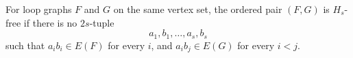 \begin{definition}
For loop graphs \(F\) and \(G\) on the same vertex set, the ordered pair \((F,G)\) is \(H_s\)-free if there is no \(2s\)-tuple
\[
  a_1,b_1,\ldots,a_s,b_s
\]
such that \(a_i b_i\in E(F)\) for every \(i\), and \(a_i b_j\in E(G)\) for every \(i<j\).
\end{definition}
